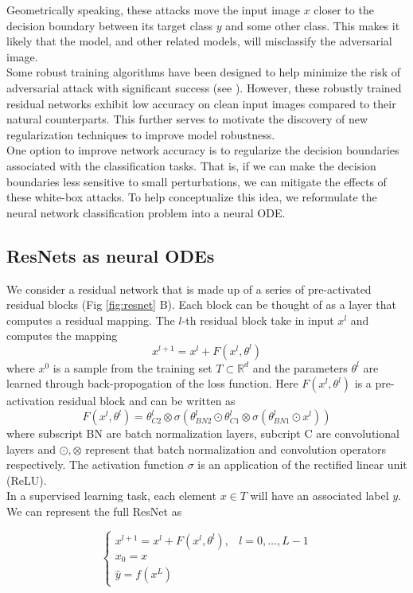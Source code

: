 \documentclass[12pt]{article}
\begin{document}
Geometrically speaking, these attacks move the input image $x$ closer to the decision boundary between its target class $y$ and some other class. This makes it likely that the model, and other related models, will misclassify the adversarial image. \\
Some robust training algorithms have been designed to help minimize the risk of adversarial attack with significant success (see \cite{earmadv}). However, these robustly trained residual networks exhibit low accuracy on clean input images compared to their natural counterparts. This further serves to motivate the discovery of new regularization techniques to improve model robustness.\\
\indent One option to improve network accuracy is to regularize the decision boundaries associated with the classification tasks. That is, if we can make the decision boundaries less sensitive to small perturbations, we can mitigate the effects of these white-box attacks. To help conceptualize this idea, we reformulate the neural network classification problem into a neural ODE.
\subsection{ResNets as neural ODEs}
We consider a residual network that is made up of a series of pre-activated residual blocks (Fig \ref{fig:resnet} B). Each block can be thought of as a layer that computes a residual mapping. The $l$-th residual block take in input $x^l$ and computes the mapping
$$ x^{l+1} = x^{l} + F(x^l,\theta^l)$$
where $x^0$ is a sample from the training set $T \subset \mathbb{R}^d $ and the parameters $\theta^l$ are learned through back-propogation of the loss function. Here $F(x^l,\theta^l)$ is a pre-activation residual block and can be written as
$$ F(x^l,\theta^l) =  \theta^l_{C2}\otimes\sigma(\theta^l_{BN2}\odot\theta^l_{C1}\otimes\sigma(\theta^l_{BN1}\odot x^l))$$
where subscript BN are batch normalization layers, subcript C are convolutional layers and $\odot, \otimes$ represent that batch normalization and convolution operators respectively. The activation function $\sigma$ is an application of the rectified linear unit (ReLU).\\
In a supervised learning task, each element $x \in T$ will have an associated label $y$. We can represent the full ResNet as

\begin{equation} \begin{cases}
x^{l+1} = x^l + F(x^l,\theta^l), & l=0,\dots,L-1 \\
x_0 = x \\
\hat y = f(x^L)
\end{cases}
\label{eq:sys}
\end{equation}
\end{document}
